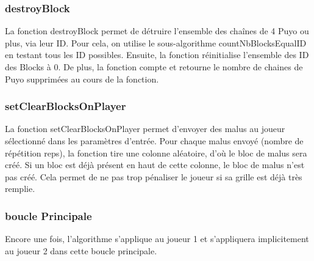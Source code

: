 \documentclass[11pt, final]{report}
\begin{document}
\subsubsection{destroyBlock}


La fonction destroyBlock permet de détruire l’ensemble des chaînes de 4 Puyo ou plus, via leur ID. Pour cela, on utilise le sous-algorithme countNbBlocksEqualID en testant tous les ID possibles. Ensuite, la fonction réinitialise l’ensemble des ID des Blocks à 0.
De plus, la fonction compte et retourne le nombre de chaines de Puyo supprimées au cours de la fonction.
\\

\subsubsection{setClearBlocksOnPlayer}


La fonction setClearBlocksOnPlayer permet d’envoyer des malus au joueur sélectionné dans les paramètres d’entrée. Pour chaque malus envoyé (nombre de répétition reps), la fonction tire une colonne aléatoire, d’où le bloc de malus sera créé. Si un bloc est déjà présent en haut de cette colonne, le bloc de malus n'est pas créé. Cela permet de ne pas trop pénaliser le joueur si sa grille est déjà très remplie.  
\\

\subsubsection{boucle Principale}

Encore une fois, l'algorithme s'applique au joueur 1 et s'appliquera implicitement au joueur 2 dans cette boucle principale. 

\end{document}
